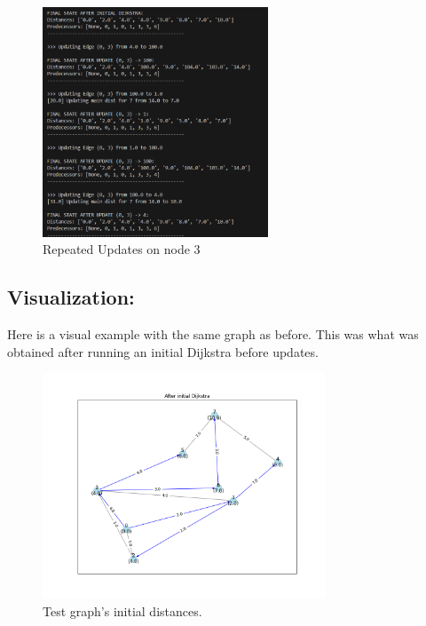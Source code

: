 \documentclass[12pt]{article}
\begin{document}
\begin{figure}[h!]
    \centering
    \includegraphics[width=0.6\textwidth]{repeated.png}
    \caption{Repeated Updates on node 3} 
    \label{repeated}
\end{figure}

\newpage

\subsection*{Visualization:}

Here is a visual example with the same graph as before. This was what was obtained after running an initial Dijkstra before updates.

\newpage

\begin{figure}[h!]
    \centering
    \includegraphics[width=0.75\textwidth]{After_initial_Dijkstra.png}
    \caption{Test graph's initial distances.} 
    \label{test_1}
\end{figure}
\end{document}
